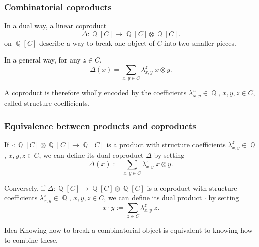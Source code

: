 \documentclass[unknownkeysallowed,10pt,xcolor={dvipsnames}]{beamer}
\DeclareMathOperator{\QQ}{\mathbb{Q}}
\begin{document}
\begin{frame} \frametitle{Combinatorial coproducts}
In a dual way, a linear coproduct
\begin{equation*}
    \Delta : \QQ[C] \to \QQ[C] \otimes \QQ[C].
\end{equation*}
on $\QQ[C]$ describe a way to \alert{break} one object of $C$ into
\alert{two smaller} pieces.
\medskip

In a general way, for any $z \in C$,
\begin{equation*}
    \Delta(x) = \sum_{x, y \in C}  \lambda_{x, y}^z \;  x \otimes y.
\end{equation*}
\medskip

A coproduct is therefore wholly encoded by the coefficients
$\lambda_{x, y}^z \in \QQ$, $x, y, z \in C$, called
\alert{structure coefficients}.
\end{frame}

\begin{frame} \frametitle{Equivalence between products and coproducts}
If $\cdot : \QQ[C] \otimes \QQ[C] \to \QQ[C]$ is a product with
structure coefficients $\lambda_{x, y}^z \in \QQ$, $x, y, z \in C$,
we can define its \alert{dual coproduct} $\Delta$ by setting
\begin{equation*}
    \Delta(x) := \sum_{x, y \in C}  \lambda_{x, y}^z \;  x \otimes y.
\end{equation*}
\medskip

Conversely, if $\Delta : \QQ[C] \to \QQ[C] \otimes \QQ[C]$ is
a coproduct with structure coefficients $\lambda_{x, y}^z \in \QQ$,
$x, y, z \in C$, we can define its \alert{dual product} $\cdot$ by
setting
\begin{equation*}
    x \cdot y := \sum_{z \in C} \lambda_{x, y}^z \; z.
\end{equation*}
\medskip

\begin{block}{Idea}
    Knowing how to break a combinatorial object is equivalent
    to knowing how to combine these.
\end{block}
\end{frame}
\end{document}
